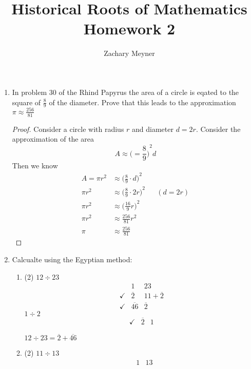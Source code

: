 \documentclass[12pt]{article}
\title{\large Historical Roots of Mathematics Homework 2}
\author{\large Zachary Meyner}
\date{}
\begin{document}
\maketitle
\begin{enumerate}[label=\textbf{\arabic*}.]
    \item In problem 30 of the Rhind Papyrus the area of a circle is eqated to the square of $\displaystyle\frac{8}{9}$ of 
    the diameter. Prove that this leads to the approximation $\pi\approx\displaystyle\frac{256}{81}$
    \begin{proof}
        Consider a circle with radius $r$ and diameter $d=2r$. Consider the approximation of the area 
        \[A \approx {\bigg(=\frac{8}{9}\bigg)}^{2}d\]
        Then we know
        \begin{align*}
            A = \pi r^{2} &\approx {\bigg(\frac{8}{9}\cdot d\bigg)}^{2} \\
            \pi r^{2} &\approx {\bigg(\frac{8}{9}\cdot 2r\bigg)}^{2} && (d = 2r) \\
             \pi r^{2} &\approx {\bigg(\frac{16}{9}r\bigg)}^{2}  \\
            \pi r^{2} &\approx \frac{256}{81}r^{2} \\
            \pi &\approx \frac{256}{81}
        \end{align*}
    \end{proof}
    \item Calcualte using the Egyptian method:
    \begin{enumerate}
        \item 
        \begin{tasks}[label=] (2)
            \task$12 \div 23$
        \begin{align*}
            &1 & 23 \\
            \checkmark&\overline{2} & 11 + \overline{2} \\
            \checkmark&\overline{46} & \overline{2}
        \end{align*}
        \task$1 \div 2 $
        \begin{align*}
            \checkmark&\overline{2} & 1
        \end{align*}
    \end{tasks}
    $12 \div 23 = \overline{2} + \overline{46}$
    \pagebreak
    \item
    \begin{tasks}[label=] (2)
        \task$11 \div 13$
        \begin{align*}
            &1 & 13 \\

\end{align*}
\end{tasks}
\end{enumerate}
\end{enumerate}
\end{document}
